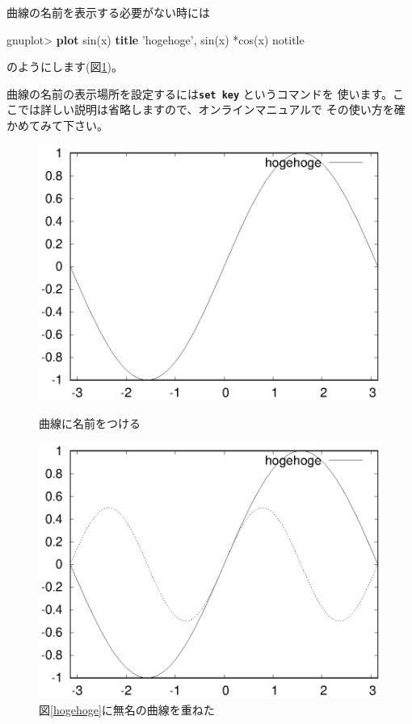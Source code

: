 \documentclass[a4j]{ujarticle} %
\newenvironment{terminal}{%
  \begin{center}
   \begin{minipage}{.8\textwidth}
    \setlength{\FrameSep}{.5\FrameSep}%
    \begin{framed}\ttfamily\small%
     \setlength\baselineskip{.85\baselineskip}%
}{%
    \end{framed}
   \end{minipage}
  \end{center}%
}
\begin{document}
曲線の名前を表示する必要がない時には
\begin{terminal}
gnuplot> {\bf plot} sin(x) {\bf title} 'hogehoge', sin(x)%
*cos(x) notitle
\end{terminal}
のようにします(図\ref{hogehoge2})。

曲線の名前の表示場所を設定するには{\tt\bf set key} というコマンドを
使います。ここでは詳しい説明は省略しますので、オンラインマニュアルで
その使い方を確かめてみて下さい。

\begin{figure}
\begin{minipage}[hbtp]{0.49\textwidth}
\includegraphics[width=\hsize]{hogehoge.eps}
\caption{曲線に名前をつける}
\label{hogehoge}
\end{minipage}
\begin{minipage}[htbp]{0.49\textwidth}
\includegraphics[width=\hsize]{hogehoge2.eps}
\caption{図\ref{hogehoge}に無名の曲線を重ねた}
\label{hogehoge2}
\end{minipage}
\end{figure}
\end{document}
